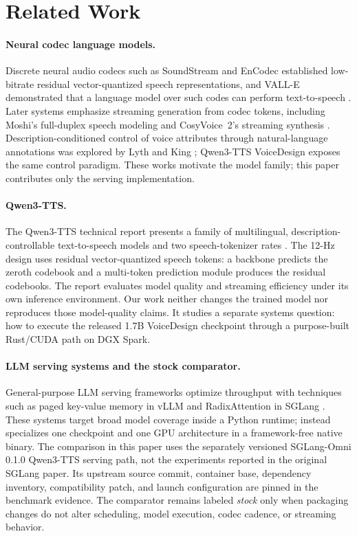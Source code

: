 \section{Related Work}

\paragraph{Neural codec language models.}
Discrete neural audio codecs such as SoundStream
\cite{zeghidour2021soundstream} and EnCodec \cite{defossez2022encodec}
established low-bitrate residual vector-quantized speech representations, and
VALL-E demonstrated that a language model over such codes can perform
text-to-speech \cite{wang2023valle}. Later systems emphasize streaming
generation from codec tokens, including Moshi's full-duplex speech modeling
\cite{defossez2024moshi} and CosyVoice~2's streaming synthesis
\cite{du2024cosyvoice2}. Description-conditioned control of voice attributes
through natural-language annotations was explored by Lyth and King
\cite{lyth2024parler}; Qwen3-TTS VoiceDesign exposes the same control paradigm.
These works motivate the model family; this paper contributes only the serving
implementation.

\paragraph{Qwen3-TTS.}
The Qwen3-TTS technical report presents a family of multilingual,
description-controllable text-to-speech models and two speech-tokenizer rates
\cite{hu2026qwen3tts}. The 12-Hz design uses residual vector-quantized speech
tokens: a backbone predicts the zeroth codebook and a multi-token prediction
module produces the residual codebooks. The report evaluates model quality and
streaming efficiency under its own inference environment. Our work neither
changes the trained model nor reproduces those model-quality claims. It studies
a separate systems question: how to execute the released 1.7B VoiceDesign
checkpoint through a purpose-built Rust/CUDA path on DGX Spark.

\paragraph{LLM serving systems and the stock comparator.}
General-purpose LLM serving frameworks optimize throughput with techniques
such as paged key-value memory in vLLM \cite{kwon2023vllm} and RadixAttention
in SGLang \cite{zheng2023sglang}. These systems target broad model coverage
inside a Python runtime; \projectname{} instead specializes one checkpoint and
one GPU architecture in a framework-free native binary. The comparison in this paper uses the separately
versioned SGLang-Omni 0.1.0 Qwen3-TTS serving path, not the experiments reported
in the original SGLang paper. Its upstream source commit, container base,
dependency inventory, compatibility patch, and launch configuration are pinned
in the benchmark evidence. The comparator remains labeled \emph{stock} only
when packaging changes do not alter scheduling, model execution, codec cadence,
or streaming behavior.

